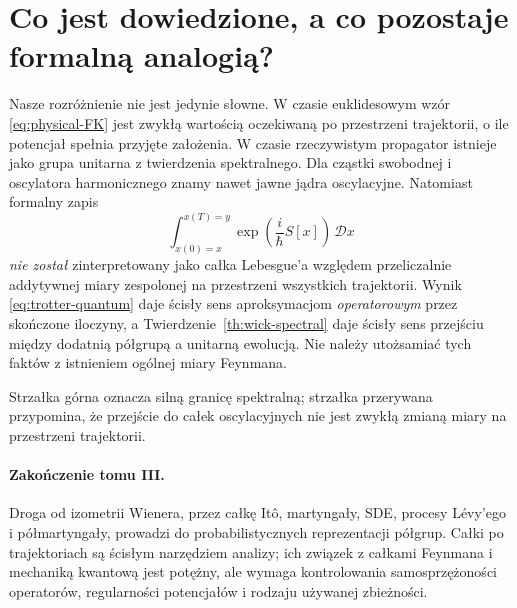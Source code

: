 \documentclass[11pt,a4paper,oneside]{report}
\numberwithin{equation}{chapter}
\theoremstyle{plain}
\theoremstyle{definition}
\theoremstyle{remark}
\newcommand{\R}{\mathbb{R}}
\begin{document}
\section{Co jest dowiedzione, a co pozostaje formalną analogią?}\label{sec:volIII:16:08}

Nasze rozróżnienie nie jest jedynie słowne. W czasie
euklidesowym wzór \eqref{eq:physical-FK} jest zwykłą
wartością oczekiwaną po przestrzeni trajektorii, o ile
potencjał spełnia przyjęte założenia. W czasie rzeczywistym
propagator istnieje jako grupa unitarna z twierdzenia
spektralnego. Dla cząstki swobodnej i oscylatora
harmonicznego znamy nawet jawne jądra oscylacyjne.
Natomiast formalny zapis
\[
 \int_{x(0)=x}^{x(T)=y}
  \exp\left(\frac{i}{\hbar}S[x]\right)\,\mathcal D x
\]
\emph{nie został} zinterpretowany jako całka Lebesgue'a
względem przeliczalnie addytywnej miary zespolonej na
przestrzeni wszystkich trajektorii.
Wynik \eqref{eq:trotter-quantum} daje ścisły sens
aproksymacjom \emph{operatorowym} przez skończone iloczyny,
a Twierdzenie~\ref{th:wick-spectral} daje ścisły sens
przejściu między dodatnią półgrupą a unitarną ewolucją.
Nie należy utożsamiać tych faktów z istnieniem
ogólnej miary Feynmana.

\begin{center}
\par\smallskip\small
Strzałka górna oznacza silną granicę spektralną; strzałka
przerywana przypomina, że przejście do całek oscylacyjnych
nie jest zwykłą zmianą miary na przestrzeni trajektorii.
\end{center}

\paragraph{Zakończenie tomu III.}
Droga od izometrii Wienera, przez całkę Itô, martyngały,
SDE, procesy Lévy'ego i półmartyngały, prowadzi do
probabilistycznych reprezentacji półgrup. Całki po
trajektoriach są ścisłym narzędziem analizy; ich związek
z całkami Feynmana i mechaniką kwantową jest potężny,
ale wymaga kontrolowania samosprzężoności operatorów,
regularności potencjałów i rodzaju używanej zbieżności.
\end{document}

